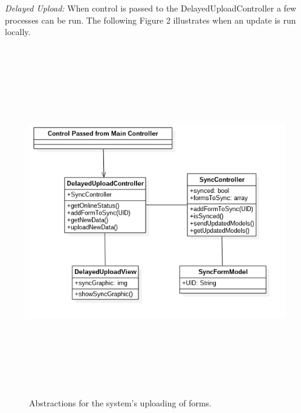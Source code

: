 \documentclass[twoside,letterpaper]{article}
\begin{document}
\newpage
\noindent\textit{Delayed Upload:}
\newline
When control is passed to the DelayedUploadController a few processes can be run. The following Figure 2 illustrates when an update is run locally. 

\begin{figure}[H]
\centering
\includegraphics[width=6in,height=6in]{Delayed_Upload_UML.png}
\caption{Abstractions for the system's uploading of forms.}
\end{figure}
\end{document}
